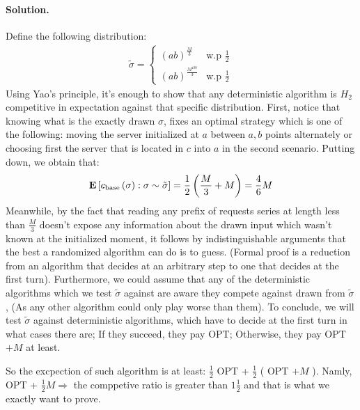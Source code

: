 \documentclass{article}
\begin{document}
\begin{multicols*}{2}
  \paragraph{Solution.} Define the following distribution: 
  \begin{equation*}
    \begin{split}
      \tilde{\sigma} = \begin{cases}
	(ab)^{\frac{M}{3}} & \text{w.p  } \frac{1}{2} \\ 
	(ab)^{\frac{M^{100}}{3}} &  \text{w.p  } \frac{1}{2}  
      \end{cases}
    \end{split}
  \end{equation*}
  Using Yao's principle, it's enough to show that any deterministic algorithm is $H_{2}$ competitive in expectation against that specific distribution. First, notice that knowing what is the exactly drawn $\sigma$, fixes an optimal strategy which is one of the following: moving the server initialized at $a$ between $a,b$ points alternately or choosing first the server that is located in $c$ into $a$ in the second scenario.
  Putting down, we obtain that: 
  \begin{equation*}
    \begin{split}
      \mathbf{E} \left[ { c_{\text{base}} \left( \sigma \right)   : \sigma \sim \tilde{\sigma}} \right] = \frac{1}{2} \left(  \frac{M}{3} + M  \right) = \frac{4}{6}M 
    \end{split}
  \end{equation*}
  Meanwhile, by the fact that reading any prefix of requests series at length less than $\frac{M}{3}$ doesn't expose any information about the drawn input which wasn't known at the initialized moment, it follows by indistinguishable arguments that the best a randomized algorithm can do is to guess. (Formal proof is a reduction from an algorithm that decides at an arbitrary step to one that decides at the first turn). Furthermore, we could assume that any of the deterministic algorithms which we test $\tilde{\sigma}$ against are aware they compete against drawn from $\tilde{\sigma}$, (As any other algorithm could only play worse than them). To conclude, we will test $\tilde{\sigma}$ against deterministic algorithms, which have to decide at the first turn in what cases there are; If they succeed, they pay OPT; Otherwise, they pay OPT $ + M$ at least. 

  So the excpection of such algorithm is at least: $ \frac{1}{2} $ OPT + $ \frac{1}{2} $ ( OPT $+ M$ ). Namly, OPT + $\frac{1}{2} M \Rightarrow $ the comppetive ratio is greater than $ 1\frac{1}{2}  $  and that is what we exactly want to prove.


\end{multicols*}
\end{document}
